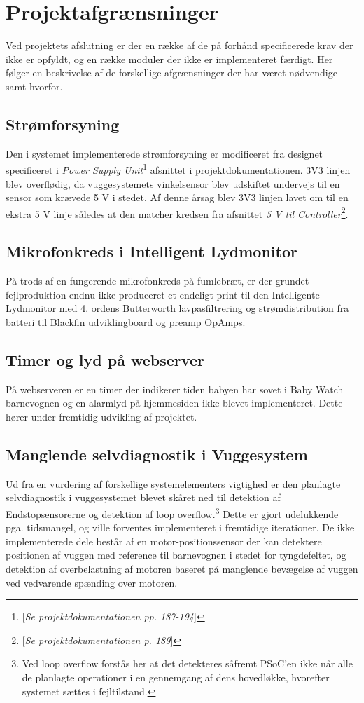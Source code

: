 %
\chapter{Projektafgrænsninger}
\label{projektafgraensninger}
Ved projektets afslutning er der en række af de på forhånd specificerede krav der ikke er opfyldt, og en række moduler der ikke er implementeret færdigt. Her følger en beskrivelse af de forskellige afgrænsninger der har været nødvendige samt hvorfor. 

\section{Strømforsyning}
Den i systemet implementerede strømforsyning er modificeret fra designet specificeret i \textit{Power Supply Unit}\footnote{[\textit{Se projektdokumentationen pp. 187-194}]} afsnittet i projektdokumentationen. 3V3 linjen blev overflødig, da vuggesystemets vinkelsensor blev udskiftet undervejs til en sensor som krævede 5 V i stedet. Af denne årsag blev 3V3 linjen lavet om til en ekstra 5 V linje således at den matcher kredsen fra afsnittet \textit{5 V til Controller}\footnote{[\textit{Se projektdokumentationen p. 189}]}.

\section{Mikrofonkreds i Intelligent Lydmonitor}
På trods af en fungerende mikrofonkreds på fumlebræt, er der grundet fejlproduktion endnu ikke produceret et endeligt print til den Intelligente Lydmonitor med 4. ordens Butterworth lavpasfiltrering og strømdistribution fra batteri til Blackfin udviklingboard \citep{EzKit} og preamp OpAmps.

\section{Timer og lyd på webserver}
På webserveren er en timer der indikerer tiden babyen har sovet i Baby Watch barnevognen og en alarmlyd på hjemmesiden ikke blevet implementeret. Dette hører under fremtidig udvikling af projektet. 

\section{Manglende selvdiagnostik i Vuggesystem}
Ud fra en vurdering af forskellige systemelementers vigtighed er den planlagte selvdiagnostik i vuggesystemet blevet skåret ned til detektion af Endstopsensorerne og detektion af loop overflow.\footnote{Ved loop overflow forstås her at det detekteres såfremt PSoC'en \citep{website:Cypress} ikke når alle de planlagte operationer i en gennemgang af dens hovedløkke, hvorefter systemet sættes i fejltilstand.} Dette er gjort udelukkende pga. tidsmangel, og ville forventes implementeret i fremtidige iterationer. De ikke implementerede dele består af en motor-positionssensor der kan detektere positionen af vuggen med reference til barnevognen i stedet for tyngdefeltet, og detektion af overbelastning af motoren baseret på manglende bevægelse af vuggen ved vedvarende spænding over motoren. 

